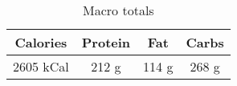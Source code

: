 \begin{multicols}{2}
\begin{enumerate}
\begin{table}[H]
  \begin{center}
    \caption{Macro totals}
    \label{tab:table1}
    \begin{tabular}{c|c|c|c} %
      \textbf{Calories} & \textbf{Protein} & \textbf{Fat} & \textbf{Carbs}\\
      \hline
      2605 kCal & 212 g & 114 g & 268 g\\
    \end{tabular}
  \end{center}
\end{table}
 
\end{enumerate}
\end{multicols}